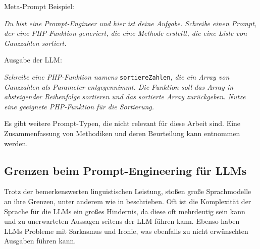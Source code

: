 Meta-Prompt Beispiel:

\textit{Du bist eine Prompt-Engineer und hier ist deine Aufgabe. Schreibe einen Prompt, der eine PHP-Funktion generiert, die eine Methode erstellt, die eine Liste von Ganzzahlen sortiert.}\vspace{0.2cm}

Ausgabe der LLM:

\textit{Schreibe eine PHP-Funktion namens} \texttt{sortiereZahlen}\textit{, die ein Array von Ganzzahlen als Parameter entgegennimmt. Die Funktion soll das Array in absteigender Reihenfolge sortieren und das sortierte Array zurückgeben. Nutze eine geeignete PHP-Funktion für die Sortierung.}\vspace{0.2cm}

Es gibt weitere Prompt-Typen, die nicht relevant für diese Arbeit sind. Eine Zusammenfassung von Methodiken und deren Beurteilung kann \cite{chen-2023} entnommen werden.\vspace{0.2cm}


\subsection{Grenzen beim Prompt-Engineering für LLMs}
Trotz der bemerkenswerten linguistischen Leistung, stoßen große Sprachmodelle an ihre Grenzen, unter anderem wie in \cite{amatriain-2024} beschrieben. Oft ist die Komplexität der Sprache für die LLMs ein großes Hindernis, da diese oft mehrdeutig sein kann und zu unerwarteten Aussagen seitens der LLM führen kann. Ebenso haben LLMs Probleme mit Sarkasmus und Ironie, was ebenfalls zu nicht erwünschten Ausgaben führen kann.\vspace{0.2cm}

